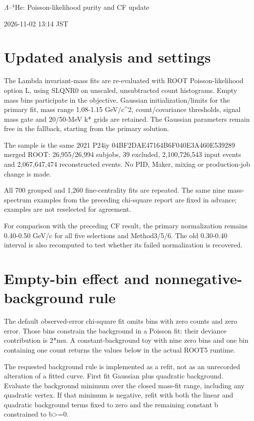 \documentclass[10pt,a4paper]{article}
\begin{document}
\begin{center}{\Large $\Lambda$--$^{4}$He: Poisson-likelihood purity and CF update}\end{center}
2026-11-02 13:14 JST

\section*{Updated analysis and settings}
The Lambda invariant-mass fits are re-evaluated with ROOT Poisson-likelihood option L, using SLQNR0 on unscaled, unsubtracted count histograms. Empty mass bins participate in the objective. Gaussian initialization/limits for the primary fit, mass range 1.08-1.15 GeV/c\textasciicircum{}2, count/covariance thresholds, signal mass gate and 20/50-MeV k* grids are retained. The Gaussian parameters remain free in the fallback, starting from the primary solution.

The sample is the same 2021 P24iy 04BF2DAE47164B6F040E3A460E539289 merged ROOT: 26,955/26,994 subjobs, 39 excluded, 2,100,726,543 input events and 2,067,647,474 reconstructed events. No PID, Maker, mixing or production-job change is made.

All 700 grouped and 1,260 fine-centrality fits are repeated. The same nine mass-spectrum examples from the preceding chi-square report are fixed in advance; examples are not reselected for agreement.

For comparison with the preceding CF result, the primary normalization remains 0.40-0.50 GeV/c for all five selections and Method3/5/6. The old 0.30-0.40 interval is also recomputed to test whether its failed normalization is recovered.

\clearpage
\section*{Empty-bin effect and nonnegative-background rule}
The default observed-error chi-square fit omits bins with zero counts and zero error. Those bins constrain the background in a Poisson fit: their deviance contribution is 2*mu. A constant-background toy with nine zero bins and one bin containing one count returns the values below in the actual ROOT5 runtime.

The requested background rule is implemented as a refit, not as an unrecorded alteration of a fitted curve. First fit Gaussian plus quadratic background. Evaluate the background minimum over the closed mass-fit range, including any quadratic vertex. If that minimum is negative, refit with both the linear and quadratic background terms fixed to zero and the remaining constant b constrained to b>=0.
\end{document}
